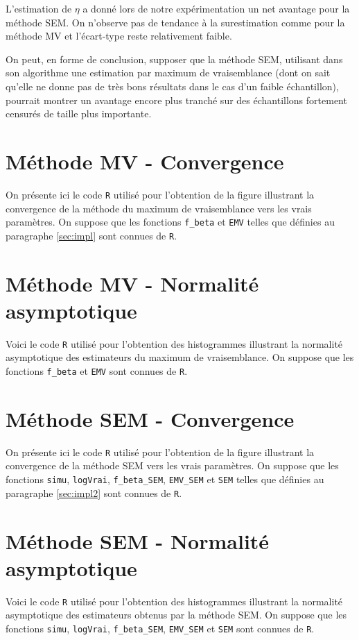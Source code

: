 \documentclass[a4paper]{report}
\begin{document}
L'estimation de $\eta$ a donné lors de notre expérimentation un net avantage pour la méthode SEM. On n'observe pas de tendance à la surestimation comme pour la méthode MV et l'écart-type reste relativement faible. 

On peut, en forme de conclusion, supposer que la méthode SEM, utilisant dans son algorithme une estimation par maximum de vraisemblance (dont on sait qu'elle ne donne pas de très bons résultats dans le cas d'un faible échantillon), pourrait montrer un avantage encore plus tranché sur des échantillons fortement censurés de taille plus importante. 

  
 \begin{appendix}
 \chapter{Méthode MV - Convergence}
 \label{MV_cv}
 On présente ici le code \verb|R| utilisé pour l'obtention de la figure illustrant la convergence de la méthode du maximum de vraisemblance vers les vrais paramètres. On suppose que les fonctions \verb|f_beta| et \verb|EMV| telles que définies au paragraphe \ref{sec:impl} sont connues de \verb|R|.
  
  
   \chapter{Méthode MV - Normalité asymptotique}
 \label{MV_norm}
 Voici le code \verb|R| utilisé pour l'obtention des histogrammes illustrant la normalité asymptotique des estimateurs du maximum de vraisemblance. On suppose que les fonctions \verb|f_beta| et \verb|EMV| sont connues de \verb|R|.
  
 
  
   \chapter{Méthode SEM - Convergence}
 \label{SEM_cv}
 On présente ici le code \verb|R| utilisé pour l'obtention de la figure illustrant la convergence de la méthode SEM vers les vrais paramètres. On suppose que les fonctions \verb|simu|, \verb|logVrai|, \verb|f_beta_SEM|, \verb|EMV_SEM| et \verb|SEM| telles que définies au paragraphe \ref{sec:impl2} sont connues de \verb|R|.
  
  
   \chapter{Méthode SEM - Normalité asymptotique}
 \label{SEM_norm}
 Voici le code \verb|R| utilisé pour l'obtention des histogrammes illustrant la normalité asymptotique des estimateurs obtenus par la méthode SEM. On suppose que les fonctions \verb|simu|, \verb|logVrai|, \verb|f_beta_SEM|, \verb|EMV_SEM| et \verb|SEM| sont connues de \verb|R|.
  
  

\end{appendix}
\end{document}
